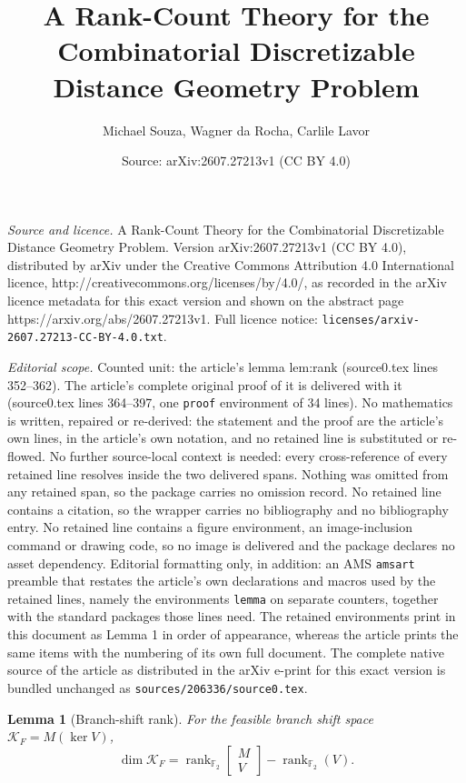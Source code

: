 \documentclass[10pt,a4paper]{amsart}
\title{A Rank-Count Theory for the Combinatorial Discretizable Distance Geometry Problem}
\author{Michael Souza, Wagner da Rocha, Carlile Lavor}
\date{Source: arXiv:2607.27213v1 (CC BY 4.0)}
\newtheorem{lemma}{Lemma}
\begin{document}
\maketitle

\noindent\emph{Source and licence.} A Rank-Count Theory for the Combinatorial Discretizable Distance Geometry Problem. Version arXiv:2607.27213v1 (CC BY 4.0), distributed by arXiv under the Creative Commons Attribution 4.0 International licence, http://creativecommons.org/licenses/by/4.0/, as recorded in the arXiv licence metadata for this exact version and shown on the abstract page https://arxiv.org/abs/2607.27213v1. Full licence notice: \texttt{licenses/arxiv-2607.27213-CC-BY-4.0.txt}.\par\smallskip

\noindent\textit{Editorial scope.} Counted unit: the article's lemma lem:rank (source0.tex lines 352--362). The article's complete original proof of it is delivered with it (source0.tex lines 364--397, one \texttt{proof} environment of 34 lines). No mathematics is written, repaired or re-derived: the statement and the proof are the article's own lines, in the article's own notation, and no retained line is substituted or re-flowed.  No further source-local context is needed: every cross-reference of every retained line resolves inside the two delivered spans.  Nothing was omitted from any retained span, so the package carries no omission record.  No retained line contains a citation, so the wrapper carries no bibliography and no bibliography entry.  No retained line contains a figure environment, an image-inclusion command or drawing code, so no image is delivered and the package declares no asset dependency.  Editorial formatting only, in addition: an AMS \texttt{amsart} preamble that restates the article's own declarations and macros used by the retained lines, namely the environments \texttt{lemma} on separate counters, together with the standard packages those lines need.  The retained environments print in this document as Lemma 1 in order of appearance, whereas the article prints the same items with the numbering of its own full document.  The complete native source of the article as distributed in the arXiv e-print for this exact version is bundled unchanged as \texttt{sources/206336/source0.tex}.
\begin{lemma}[Branch-shift rank]
\label{lem:rank}
For the feasible branch shift space $\mathcal{K}_F = M(\ker V)$,
\[
\dim \mathcal{K}_F
=
\operatorname{rank}_{\mathbb{F}_2}\begin{bmatrix} M \\ V \end{bmatrix}
-
\operatorname{rank}_{\mathbb{F}_2}(V).
\]
\end{lemma}
\end{document}
